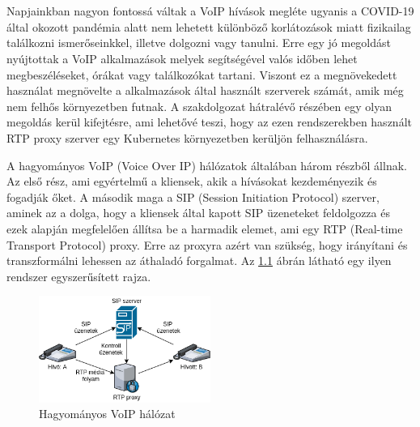 \chapter{\bevezetes}

Napjainkban nagyon fontossá váltak a VoIP hívások megléte ugyanis a COVID-19 által okozott
pandémia alatt nem lehetett különböző korlátozások miatt fizikailag találkozni ismerőseinkkel, illetve dolgozni vagy tanulni. Erre egy jó megoldást nyújtottak a VoIP alkalmazások melyek segítségével valós időben lehet megbeszéléseket, órákat vagy találkozókat tartani. Viszont ez a megnövekedett használat megnövelte a alkalmazások által használt szerverek számát, amik még nem felhős környezetben futnak. A szakdolgozat hátralévő részében egy olyan megoldás kerül kifejtésre, ami lehetővé teszi, hogy az ezen rendszerekben használt RTP proxy szerver egy Kubernetes környezetben kerüljön felhasználásra. 

A hagyományos VoIP (Voice Over IP) hálózatok általában három részből állnak.
Az első rész, ami egyértelmű a kliensek, akik a hívásokat kezdeményezik és 
fogadják őket. A második maga a SIP (Session Initiation Protocol) szerver, aminek
az a dolga, hogy a kliensek által kapott SIP üzeneteket feldolgozza és ezek alapján
megfelelően állítsa be a harmadik elemet, ami egy RTP (Real-time Transport Protocol) 
proxy. Erre az proxyra azért van szükség, hogy irányítani és transzformálni lehessen az 
áthaladó forgalmat. Az \ref{fig:tradVoIP} ábrán látható egy ilyen rendszer egyszerűsített 
rajza.

\begin{figure}[!ht]
	\centering
	\includegraphics[width=0.5\textwidth, keepaspectratio]{figures/traditional_voip.png}
	\caption{Hagyományos VoIP hálózat}
	\label{fig:tradVoIP}
\end{figure}

